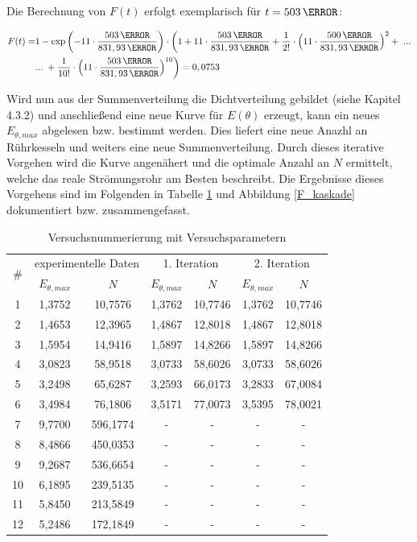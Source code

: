 \documentclass[12pt,liststotoc]{report}
\begin{document}
Die Berechnung von $F(t)$ erfolgt exemplarisch für $t = 503\,\s$:

\begin{align*}
F(t)=&1-\text{exp}\left(-11\cdot\frac{503\,\s}{831,93\,\s}\right) \cdot \biggl(1+11\cdot\frac{503\,\s}{831,93\,\s} + \frac{1}{2!}\cdot \Bigl(11\cdot\frac{500\,\s}{831,93\,\s}\Bigr)^2 +\;...\\
&...\;+\frac{1}{10!}\cdot\Bigl(11\cdot\frac{503\,\s}{831,93\,\s}\Bigr)^{10} \biggr) = 0,0753 \notag
\end{align*}

Wird nun aus der Summenverteilung die Dichtverteilung gebildet (siehe Kapitel 4.3.2) und anschließend eine neue Kurve für $E(\theta)$ erzeugt, kann ein neues $E_{\theta,max}$ abgelesen bzw. bestimmt werden. Dies liefert eine neue Anazhl an Rührkesseln und weiters eine neue Summenverteilung. Durch dieses iterative Vorgehen wird die Kurve angenähert und die optimale Anzahl an $N$ ermittelt, welche das reale Strömungsrohr am Besten beschreibt. Die Ergebnisse dieses Vorgehens sind im Folgenden in Tabelle \ref{tab:kaskade} und Abbildung \ref{F_kaskade} dokumentiert bzw. zusammengefasst.

\begin{table}[H]
\centering
\caption{Versuchsnummerierung mit Versuchsparametern}
     \begin{tabular}{c|cc|cc|cc}
     \toprule
    \multirow{2}[1]{*}{\#} & \multicolumn{2}{c|}{experimentelle Daten} & \multicolumn{2}{c|}{1. Iteration} & \multicolumn{2}{c}{2. Iteration} \\
          & $E_{\theta,max}$ & $N$     & $E_{\theta,max}$ & $N$ & $E_{\theta,max}$ & $N$ \\
    \midrule
    1     & 1,3752 & 10,7576 & 1,3762 & 10,7746 & 1,3762 & 10,7746 \\
    2     & 1,4653 & 12,3965 & 1,4867 & 12,8018 & 1,4867 & 12,8018 \\
    3     & 1,5954 & 14,9416 & 1,5897 & 14,8266 & 1,5897 & 14,8266 \\
    4     & 3,0823 & 58,9518 & 3,0733 & 58,6026 & 3,0733 & 58,6026 \\
    5     & 3,2498 & 65,6287 & 3,2593 & 66,0173 & 3,2833 & 67,0084 \\
    6     & 3,4984 & 76,1806 & 3,5171 & 77,0073 & 3,5395 & 78,0021 \\
    7     & 9,7700 & 596,1774 & - & - & - & - \\
    8     & 8,4866 & 450,0353 & - & - & - & - \\
    9     & 9,2687 & 536,6654 & - & - & - & - \\
    10    & 6,1895 & 239,5135 & - & - & - & - \\
    11    & 5,8450 & 213,5849 & - & - & - & - \\
    12    & 5,2486 & 172,1849 & - & - & - & - \\
    \bottomrule
    \end{tabular}%
\label{tab:kaskade}
\end{table}
\noindent
\end{document}
